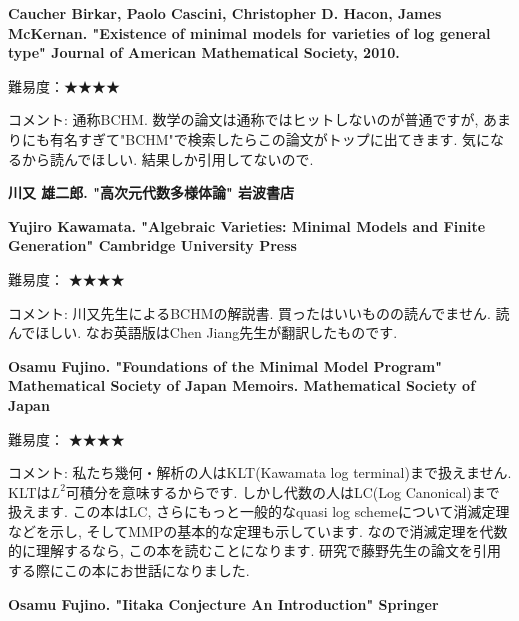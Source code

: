  \textbf{Caucher Birkar, Paolo Cascini, Christopher D. Hacon, James McKernan. "Existence of minimal models for varieties of log general type" Journal of American Mathematical Society, 2010.} \vspace{-6pt}

難易度：★★★★\vspace{-6pt} 

コメント: 通称BCHM. 数学の論文は通称ではヒットしないのが普通ですが, あまりにも有名すぎて"BCHM"で検索したらこの論文がトップに出てきます. 気になるから読んでほしい. 結果しか引用してないので. 
\vspace{8pt}

\textbf{川又 雄二郎. "高次元代数多様体論" 岩波書店} \vspace{-6pt}

\textbf{Yujiro Kawamata. "Algebraic Varieties: Minimal Models and Finite Generation" Cambridge University Press} \vspace{-6pt}

難易度： ★★★★\vspace{-6pt} 

コメント: 川又先生によるBCHMの解説書. 買ったはいいものの読んでません. 読んでほしい.
なお英語版はChen Jiang先生が翻訳したものです. 
\vspace{8pt}


\textbf{Osamu Fujino. "Foundations of the Minimal Model Program" Mathematical Society of Japan Memoirs. Mathematical Society of Japan} \vspace{-6pt}

難易度： ★★★★\vspace{-6pt} 

コメント: 私たち幾何・解析の人はKLT(Kawamata log terminal)まで扱えません. KLTは$L^2$可積分を意味するからです. しかし代数の人はLC(Log Canonical)まで扱えます. この本はLC, さらにもっと一般的なquasi log schemeについて消滅定理などを示し, そしてMMPの基本的な定理も示しています. 
なので消滅定理を代数的に理解するなら, この本を読むことになります. 
研究で藤野先生の論文を引用する際にこの本にお世話になりました. 


\vspace{8pt}


\textbf{Osamu Fujino. "Iitaka Conjecture An Introduction" Springer} \vspace{-6pt}

